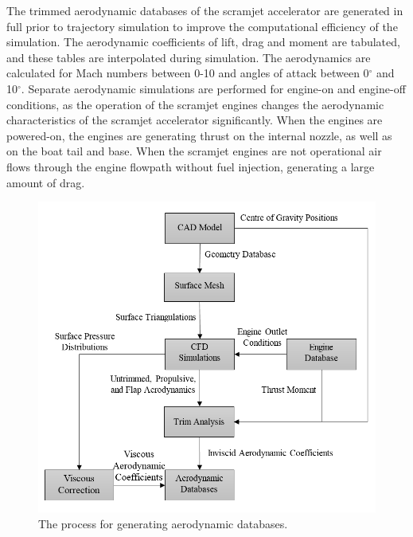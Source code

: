 The trimmed aerodynamic databases of the scramjet accelerator are generated in full prior to trajectory simulation to improve the computational efficiency of the simulation. The aerodynamic coefficients of lift, drag and moment are tabulated, and these tables are interpolated during simulation. 
The aerodynamics are calculated for Mach numbers between 0-10 and angles of attack between 0$^\circ$ and 10$^\circ$. Separate aerodynamic simulations are performed for engine-on and engine-off conditions, as the operation of the scramjet engines changes the aerodynamic characteristics of the scramjet accelerator significantly. When the engines are powered-on, the engines are generating thrust on the internal nozzle, as well as on the boat tail and base.  When the scramjet engines are not operational air flows through the engine flowpath without fuel injection, generating a large amount of drag. 
\begin{figure}[ht]
	\centering
	\includegraphics[width=0.7\linewidth]{figures/3_vehicle_design/FlowChart.png}
	\caption{The process for generating aerodynamic databases.}
	\label{fig:FlowChart}
\end{figure}

